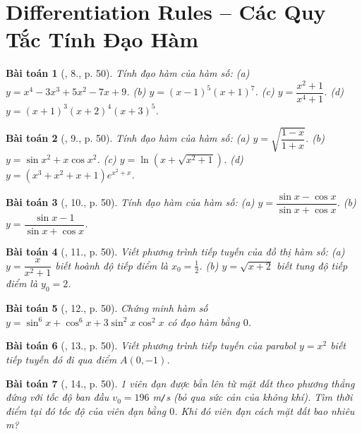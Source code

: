 \documentclass{article}
\newtheorem{baitoan}{Bài toán}
\begin{document}
\section{Differentiation Rules -- Các Quy Tắc Tính Đạo Hàm}

\begin{baitoan}[\cite{TLCT_BT_dai_so_giai_tich_11}, 8., p. 50]
	Tính đạo hàm của hàm số: (a) $y = x^4 - 3x^3 + 5x^2 - 7x + 9$. (b) $y = (x - 1)^5(x + 1)^7$. (c) $y = \dfrac{x^2 + 1}{x^4 + 1}$. (d) $y = (x + 1)^3(x + 2)^4(x + 3)^5$.
\end{baitoan}

\begin{baitoan}[\cite{TLCT_BT_dai_so_giai_tich_11}, 9., p. 50]
	Tính đạo hàm của hàm số: (a) $y = \sqrt{\dfrac{1 - x}{1 + x}}$. (b) $y = \sin x^2 + x\cos x^2$. (c) $y = \ln(x + \sqrt{x^2 + 1})$. (d) $y = (x^3 + x^2 + x + 1)e^{x^2 + x}$.
\end{baitoan}

\begin{baitoan}[\cite{TLCT_BT_dai_so_giai_tich_11}, 10., p. 50]
	Tính đạo hàm của hàm số: (a) $y = \dfrac{\sin x - \cos x}{\sin x + \cos x}$. (b) $y = \dfrac{\sin x - 1}{\sin x + \cos x}$.
\end{baitoan}

\begin{baitoan}[\cite{TLCT_BT_dai_so_giai_tich_11}, 11., p. 50]
	Viết phương trình tiếp tuyến của đồ thị hàm số: (a) $y = \dfrac{x}{x^2 + 1}$ biết hoành độ tiếp điểm là $x_0 = \frac{1}{2}$. (b) $y = \sqrt{x + 2}$ biết tung độ tiếp điểm là $y_0 = 2$.
\end{baitoan}

\begin{baitoan}[\cite{TLCT_BT_dai_so_giai_tich_11}, 12., p. 50]
	Chứng minh hàm số $y = \sin^6x + \cos^6x + 3\sin^2x\cos^2x$ có đạo hàm bằng $0$.
\end{baitoan}

\begin{baitoan}[\cite{TLCT_BT_dai_so_giai_tich_11}, 13., p. 50]
	Viết phương trình tiếp tuyến của parabol $y = x^2$ biết tiếp tuyến đó đi qua điểm $A(0,-1)$.
\end{baitoan}

\begin{baitoan}[\cite{TLCT_BT_dai_so_giai_tich_11}, 14., p. 50]
	1 viên đạn được bắn lên từ mặt đất theo phương thẳng đứng với tốc độ ban đầu $v_0 = 196$ {\rm m{\tt/}s} (bỏ qua sức cản của không khí). Tìm thời điểm tại đó tốc độ của viên đạn bằng $0$. Khi đó viên đạn cách mặt đất bao nhiêu {\rm m}?
\end{baitoan}
\end{document}
